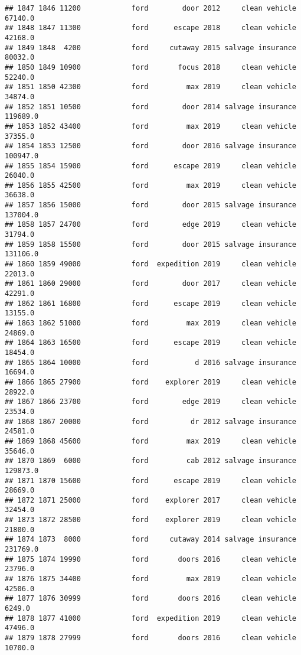 \documentclass[
]{article}
\begin{document}
\begin{verbatim}
## 1847 1846 11200            ford        door 2012     clean vehicle   67140.0
## 1848 1847 11300            ford      escape 2018     clean vehicle   42168.0
## 1849 1848  4200            ford     cutaway 2015 salvage insurance   80032.0
## 1850 1849 10900            ford       focus 2018     clean vehicle   52240.0
## 1851 1850 42300            ford         max 2019     clean vehicle   34874.0
## 1852 1851 10500            ford        door 2014 salvage insurance  119689.0
## 1853 1852 43400            ford         max 2019     clean vehicle   37355.0
## 1854 1853 12500            ford        door 2016 salvage insurance  100947.0
## 1855 1854 15900            ford      escape 2019     clean vehicle   26040.0
## 1856 1855 42500            ford         max 2019     clean vehicle   36638.0
## 1857 1856 15000            ford        door 2015 salvage insurance  137004.0
## 1858 1857 24700            ford        edge 2019     clean vehicle   31794.0
## 1859 1858 15500            ford        door 2015 salvage insurance  131106.0
## 1860 1859 49000            ford  expedition 2019     clean vehicle   22013.0
## 1861 1860 29000            ford        door 2017     clean vehicle   42291.0
## 1862 1861 16800            ford      escape 2019     clean vehicle   13155.0
## 1863 1862 51000            ford         max 2019     clean vehicle   24869.0
## 1864 1863 16500            ford      escape 2019     clean vehicle   18454.0
## 1865 1864 10000            ford           d 2016 salvage insurance   16694.0
## 1866 1865 27900            ford    explorer 2019     clean vehicle   28922.0
## 1867 1866 23700            ford        edge 2019     clean vehicle   23534.0
## 1868 1867 20000            ford          dr 2012 salvage insurance   24581.0
## 1869 1868 45600            ford         max 2019     clean vehicle   35646.0
## 1870 1869  6000            ford         cab 2012 salvage insurance  129873.0
## 1871 1870 15600            ford      escape 2019     clean vehicle   28669.0
## 1872 1871 25000            ford    explorer 2017     clean vehicle   32454.0
## 1873 1872 28500            ford    explorer 2019     clean vehicle   21800.0
## 1874 1873  8000            ford     cutaway 2014 salvage insurance  231769.0
## 1875 1874 19990            ford       doors 2016     clean vehicle   23796.0
## 1876 1875 34400            ford         max 2019     clean vehicle   42506.0
## 1877 1876 30999            ford       doors 2016     clean vehicle    6249.0
## 1878 1877 41000            ford  expedition 2019     clean vehicle   47496.0
## 1879 1878 27999            ford       doors 2016     clean vehicle   10700.0

\end{verbatim}
\end{document}
